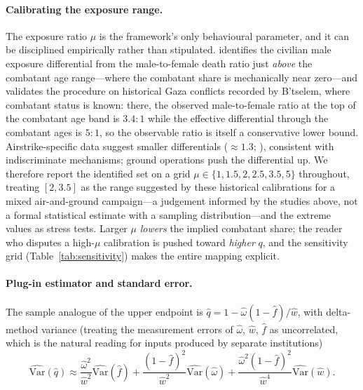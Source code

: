 \paragraph{Calibrating the exposure range.} The exposure ratio $\mu$ is the framework's only behavioural parameter, and it can be disciplined empirically rather than stipulated. \citet{frost2026} identifies the civilian male exposure differential from the male-to-female death ratio just \emph{above} the combatant age range---where the combatant share is mechanically near zero---and validates the procedure on historical Gaza conflicts recorded by B'tselem, where combatant status is known: there, the observed male-to-female ratio at the top of the combatant age band is $3.4{:}1$ while the effective differential through the combatant ages is $5{:}1$, so the observable ratio is itself a conservative lower bound. Airstrike-specific data suggest smaller differentials ($\approx 1.3$; \citealp{cockerill2024}), consistent with indiscriminate mechanisms; ground operations push the differential up. We therefore report the identified set on a grid $\mu\in\{1, 1.5, 2, 2.5, 3.5, 5\}$ throughout, treating $[2,3.5]$ as the range suggested by these historical calibrations for a mixed air-and-ground campaign---a judgement informed by the studies above, not a formal statistical estimate with a sampling distribution---and the extreme values as stress tests. Larger $\mu$ \emph{lowers} the implied combatant share; the reader who disputes a high-$\mu$ calibration is pushed toward \emph{higher} $q$, and the sensitivity grid (Table~\ref{tab:sensitivity}) makes the entire mapping explicit.

\paragraph{Plug-in estimator and standard error.} The sample analogue of the upper endpoint is $\hat q=1-\hat\omega(1-\hat f)/\hat w$, with delta-method variance (treating the measurement errors of $\hat\omega$, $\hat w$, $\hat f$ as uncorrelated, which is the natural reading for inputs produced by separate institutions)
\[
\widehat{\mathrm{Var}}(\hat q) \approx
\frac{\hat\omega^2}{\hat w^2}\widehat{\mathrm{Var}}(\hat f)
+\frac{(1-\hat f)^2}{\hat w^2}\widehat{\mathrm{Var}}(\hat\omega)
+\frac{\hat\omega^2(1-\hat f)^2}{\hat w^4}\widehat{\mathrm{Var}}(\hat w).
\]
